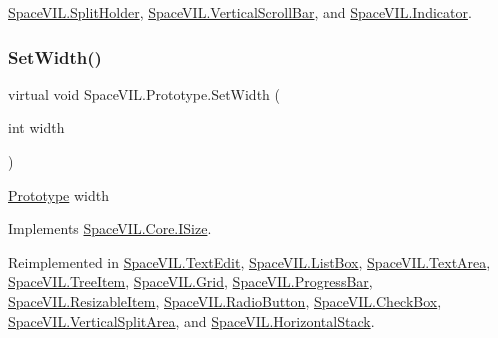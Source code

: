 \mbox{\hyperlink{class_space_v_i_l_1_1_split_holder_a0489f7db33f2310761600b11ea308c40}{Space\+V\+I\+L.\+Split\+Holder}}, \mbox{\hyperlink{class_space_v_i_l_1_1_vertical_scroll_bar_a94bfbdb137de9b7301e6e07074eb2069}{Space\+V\+I\+L.\+Vertical\+Scroll\+Bar}}, and \mbox{\hyperlink{class_space_v_i_l_1_1_indicator_aa9233e9dda656a3634bcc3ace59c00dc}{Space\+V\+I\+L.\+Indicator}}.

\mbox{\label{class_space_v_i_l_1_1_prototype_a6a4f1b9581f4d18f1c3a3e287d4b2a2b}} 
\subsubsection{\texorpdfstring{Set\+Width()}{SetWidth()}}
{\footnotesize\ttfamily virtual void Space\+V\+I\+L.\+Prototype.\+Set\+Width (\begin{DoxyParamCaption}\item[{int}]{width }\end{DoxyParamCaption})\hspace{0.3cm}{\ttfamily [virtual]}}



\mbox{\hyperlink{class_space_v_i_l_1_1_prototype}{Prototype}} width 



Implements \mbox{\hyperlink{interface_space_v_i_l_1_1_core_1_1_i_size}{Space\+V\+I\+L.\+Core.\+I\+Size}}.



Reimplemented in \mbox{\hyperlink{class_space_v_i_l_1_1_text_edit_a5e81be988e48303f9d552bdbe2953027}{Space\+V\+I\+L.\+Text\+Edit}}, \mbox{\hyperlink{class_space_v_i_l_1_1_list_box_a6e41c4678cdfd8b1a68ed0280b50cfff}{Space\+V\+I\+L.\+List\+Box}}, \mbox{\hyperlink{class_space_v_i_l_1_1_text_area_a214e3d5afc4c12519fb8594dce699ef0}{Space\+V\+I\+L.\+Text\+Area}}, \mbox{\hyperlink{class_space_v_i_l_1_1_tree_item_aa10abe8a9dafe4d597e041500618ec03}{Space\+V\+I\+L.\+Tree\+Item}}, \mbox{\hyperlink{class_space_v_i_l_1_1_grid_a2d3ce59b92ad9ca3bba2fb69feb549cb}{Space\+V\+I\+L.\+Grid}}, \mbox{\hyperlink{class_space_v_i_l_1_1_progress_bar_af970d2e5eed12540914beb9978e25665}{Space\+V\+I\+L.\+Progress\+Bar}}, \mbox{\hyperlink{class_space_v_i_l_1_1_resizable_item_a7f12553e7547d5ef653be8719e9cfee4}{Space\+V\+I\+L.\+Resizable\+Item}}, \mbox{\hyperlink{class_space_v_i_l_1_1_radio_button_a1272cbc6fa73f98592a91b53d1aa280a}{Space\+V\+I\+L.\+Radio\+Button}}, \mbox{\hyperlink{class_space_v_i_l_1_1_check_box_abcf26de1908f7d590b768d64851e8004}{Space\+V\+I\+L.\+Check\+Box}}, \mbox{\hyperlink{class_space_v_i_l_1_1_vertical_split_area_a665c01c8beced7686b57b7f4d41f3b70}{Space\+V\+I\+L.\+Vertical\+Split\+Area}}, and \mbox{\hyperlink{class_space_v_i_l_1_1_horizontal_stack_aa0650cd4cc25c1471f7b31748a6fd7e1}{Space\+V\+I\+L.\+Horizontal\+Stack}}.

